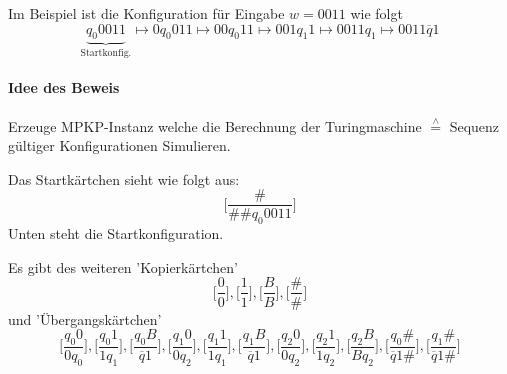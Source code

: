 \par\medskip Im Beispiel ist die Konfiguration für Eingabe $w=0011$ wie folgt $$ \underbrace{q_0 0011}_{\text{Startkonfig.}} \mapsto 0 q_0 011 \mapsto 00q_0 11 \mapsto 001q_1 1 \mapsto 0011q_1 \mapsto 0011\overline{q}1 $$

\paragraph*{Idee des Beweis} Erzeuge MPKP-Instanz welche die Berechnung der Turingmaschine $\overset{\wedge}{=}$ Sequenz gültiger Konfigurationen Simulieren.

\par\medskip Das Startkärtchen sieht wie folgt aus: $$\Big[ \frac{\#}{\#\#q_0 0011} \Big]$$ Unten steht die Startkonfiguration.

\par\medskip Es gibt des weiteren 'Kopierkärtchen' $$\Big[ \frac{0}{0} \Big], \Big[ \frac{1}{1} \Big], \Big[ \frac{B}{B} \Big], \Big[ \frac{\#}{\#} \Big]$$ und 'Übergangskärtchen' $$\Big[ \frac{q_0 0}{0q_0} \Big], \Big[ \frac{q_0 1}{1q_1} \Big], \Big[ \frac{q_0 B}{\overline{q}1} \Big], \Big[ \frac{q_1 0}{0q_2} \Big], \Big[ \frac{q_1 1}{1q_1} \Big], \Big[ \frac{q_1 B}{\overline{q}1} \Big], \Big[ \frac{q_2 0}{0q_2} \Big], \Big[ \frac{q_2 1}{1q_2} \Big], \Big[ \frac{q_2 B}{Bq_2} \Big], \Big[ \frac{q_0\#}{\overline{q}1\#} \Big], \Big[ \frac{q_1\#}{\overline{q}1\#} \Big]$$

